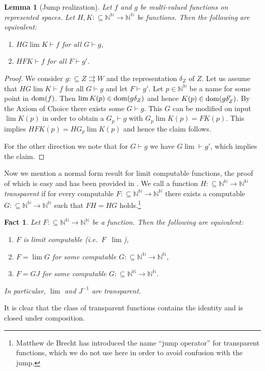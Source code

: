 \documentclass[a4paper]{amsart}
\def\IN{{\mathbb{N}}}
\def\In{\subseteq}
\def\mto{\rightrightarrows}
\def\dom{{\rm dom}}
\def\Baire{{\IN^\IN}}
\def\leqW{\mathop{\leq_{\mathrm{W}}}}
\newtheorem{lemma}[theorem]{Lemma}
\newtheorem{fact}[theorem]{Fact}
\theoremstyle{definition}
\begin{document}
\begin{lemma}[Jump realization]
\label{lem:jump-realization}
Let $f$ and $g$ be multi-valued functions on represented spaces. 
Let $H,K:\In\Baire\to\Baire$ be functions. Then the following are equivalent:
\begin{enumerate}
\item $HG\lim K\vdash f$ for all $G\vdash g$,
\item $HFK\vdash f$ for all $F\vdash g'$.
\end{enumerate}
\end{lemma}
\begin{proof}
We consider $g:\In Z\mto W$ and the representation $\delta_Z$ of $Z$.
Let us assume that $HG\lim K\vdash f$ for all $G\vdash g$ and let $F\vdash g'$.
Let $p\in\Baire$ be a name for some point in $\dom(f)$. Then $\lim K(p)\in\dom(g\delta_Z)$
and hence $K(p)\in\dom(g\delta_Z')$. 
By the Axiom of Choice there exists some $G\vdash g$. 
This $G$ can be modified on input $\lim K(p)$ in order to obtain a $G_p\vdash g$ with $G_p\lim K(p)=FK(p)$. 
This implies $HFK(p)=HG_p\lim K(p)$ and hence the claim follows.

For the other direction we note that for $G\vdash g$ we have $G\lim\vdash g'$,
which implies the claim.
\end{proof}

Now we mention a normal form result for limit computable functions, the proof of
which is easy and has been provided in \cite{Bra07x}.
We call a function $H:\In\Baire\to\Baire$ {\em transparent} if for every computable
$F:\In\Baire\to\Baire$ there exists a computable $G:\In\Baire\to\Baire$ such that
$FH=HG$ holds.\footnote{Matthew de Brecht has introduced the name ``jump operator'' for transparent
functions, which we do not use here in order to avoid confusion with the jump.}

\begin{fact}
\label{fact:galois}
Let $F:\In\Baire\to\Baire$ be a function. Then the following are equivalent:
\begin{enumerate}
\item $F$ is limit computable (i.e.\ $F\leqW\lim$),
\item $F=\lim G$ for some computable $G:\In\Baire\to\Baire$,
\item $F=GJ$ for some computable $G:\In\Baire\to\Baire$.
\end{enumerate}
In particular, $\lim$ and $J^{-1}$ are transparent.
\end{fact}

It is clear that the class of transparent functions contains the identity and is closed under
composition. 
\end{document}
